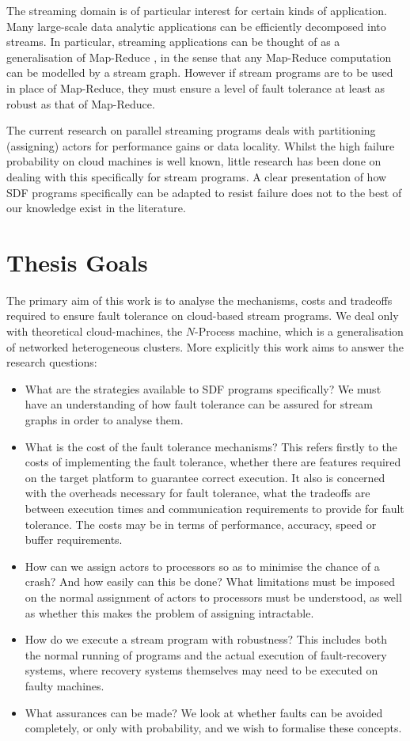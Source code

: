 The streaming domain is of particular interest for certain kinds of application.
Many large-scale data analytic applications can be efficiently decomposed into streams.
In particular, streaming applications can be thought of as a generalisation of Map-Reduce \cite{dea08}, in the sense that any Map-Reduce computation can be modelled by a stream graph.
However if stream programs are to be used in place of Map-Reduce, they must ensure a level of fault tolerance at least as robust as that of Map-Reduce.

The current research on parallel streaming programs deals with partitioning (assigning) actors for performance gains or data locality.
Whilst the high failure probability on cloud machines is well known, little research has been done on dealing with this specifically for stream programs.
A clear presentation of how SDF programs specifically can be adapted to resist failure does not to the best of our knowledge exist in the literature.

\section{Thesis Goals}
\label{secInGoal}

The primary aim of this work is to analyse the mechanisms, costs and tradeoffs required to ensure fault tolerance on cloud-based stream programs.
We deal only with theoretical cloud-machines, the $N$-Process machine, which is a generalisation of networked heterogeneous clusters.
More explicitly this work aims to answer the research questions:

\begin{itemize}
	\item What are the strategies available to SDF programs specifically?
			We must have an understanding of how fault tolerance can be assured for stream graphs in order to analyse them.
	\item What is the cost of the fault tolerance mechanisms?
			This refers firstly to the costs of implementing the fault tolerance, whether there are features required on the target platform to guarantee correct execution.
			It also is concerned with the overheads necessary for fault tolerance, what the tradeoffs are between execution times and communication requirements to provide for fault tolerance.
			The costs may be in terms of performance, accuracy, speed or buffer requirements.
	\item How can we assign actors to processors so as to minimise the chance of a crash?
			And how easily can this be done?
			What limitations must be imposed on the normal assignment of actors to processors must be understood, as well as whether this makes the problem of assigning intractable.
	\item How do we execute a stream program with robustness?
			This includes both the normal running of programs and the actual execution of fault-recovery systems, where recovery systems themselves may need to be executed on faulty machines.
	\item What assurances can be made?
			We look at whether faults can be avoided completely, or only with probability, and we wish to formalise these concepts.
\end{itemize}

